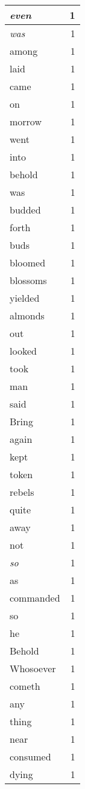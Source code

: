 \begin{center}
\begin{longtable}{l|r}
\emph{even} & 1 \\ \hline
\emph{was} & 1 \\ \hline
among & 1 \\ \hline
laid & 1 \\ \hline
came & 1 \\ \hline
on & 1 \\ \hline
morrow & 1 \\ \hline
went & 1 \\ \hline
into & 1 \\ \hline
behold & 1 \\ \hline
was & 1 \\ \hline
budded & 1 \\ \hline
forth & 1 \\ \hline
buds & 1 \\ \hline
bloomed & 1 \\ \hline
blossoms & 1 \\ \hline
yielded & 1 \\ \hline
almonds & 1 \\ \hline
out & 1 \\ \hline
looked & 1 \\ \hline
took & 1 \\ \hline
man & 1 \\ \hline
said & 1 \\ \hline
Bring & 1 \\ \hline
again & 1 \\ \hline
kept & 1 \\ \hline
token & 1 \\ \hline
rebels & 1 \\ \hline
quite & 1 \\ \hline
away & 1 \\ \hline
not & 1 \\ \hline
\emph{so} & 1 \\ \hline
as & 1 \\ \hline
commanded & 1 \\ \hline
so & 1 \\ \hline
he & 1 \\ \hline
Behold & 1 \\ \hline
Whosoever & 1 \\ \hline
cometh & 1 \\ \hline
any & 1 \\ \hline
thing & 1 \\ \hline
near & 1 \\ \hline
consumed & 1 \\ \hline
dying & 1 \\ \hline
\end{longtable}
\end{center}



